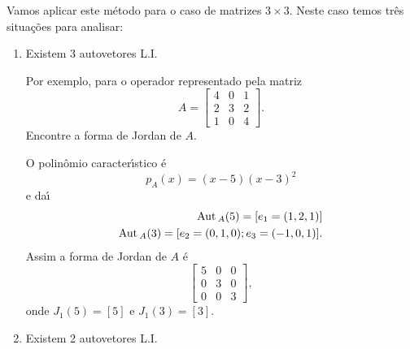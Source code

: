 Vamos aplicar este m\'etodo para o caso de matrizes $3 \times 3$. Neste caso temos tr\^es situa\c{c}\~oes para analisar:

\begin{enumerate}
	\item Existem 3 autovetores L.I.

	Por exemplo, para o operador representado pela matriz
	\[
		A = \begin{bmatrix}
			4 & 0 & 1\\
			2 & 3 & 2\\
			1 & 0 & 4
		\end{bmatrix}.
	\]
	Encontre a forma de Jordan de $A$.
	\begin{solucao}
		O polin\^omio caracter{\'\i}stico \'e
		\[
			p_A(x) = (x - 5)(x - 3)^2
		\]
		e da{\'\i}
		\begin{align*}
			{\rm Aut\,}_A(5) = [e_1 = (1,2,1)]\\
			{\rm Aut\,}_A(3) = [e_2 = (0,1,0); e_3 = (-1,0,1)].
		\end{align*}
		Assim a forma de Jordan de $A$ \'e
		\[
			\begin{bmatrix}
				5 & 0 & 0\\
				0 & 3 & 0\\
				0 & 0 & 3
			\end{bmatrix},
		\]
		onde $J_1(5) = [5]$ e $J_1(3) = [3]$.
	\end{solucao}
	\item Existem 2 autovetores L.I.


\end{enumerate}
